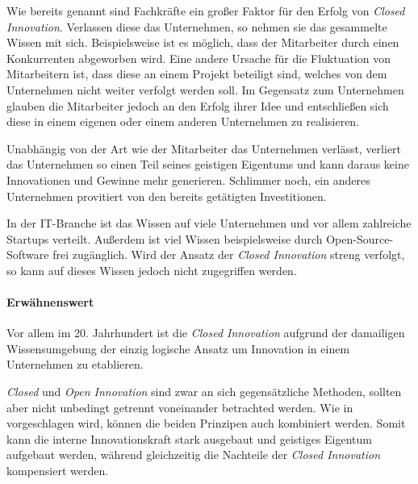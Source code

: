 Wie bereits genannt sind Fachkräfte ein großer Faktor für den Erfolg von \textit{Closed Innovation}.
Verlassen diese das Unternehmen, so nehmen sie das gesammelte Wissen mit sich.
Beispielsweise ist es möglich, dass der Mitarbeiter durch einen Konkurrenten abgeworben wird.
Eine andere Ursache für die Fluktuation von Mitarbeitern ist,
dass diese an einem Projekt beteiligt sind,
welches von dem Unternehmen nicht weiter verfolgt werden soll.
Im Gegensatz zum Unternehmen glauben die Mitarbeiter jedoch an den Erfolg ihrer Idee
und entschließen sich diese in einem eigenen oder einem anderen Unternehmen zu realisieren.

Unabhängig von der Art wie der Mitarbeiter das Unternehmen verlässt,
verliert das Unternehmen so einen Teil seines geistigen Eigentums
und kann daraus keine Innovationen und Gewinne mehr generieren.
Schlimmer noch, ein anderes Unternehmen provitiert von den bereits getätigten Investitionen.

In der IT-Branche ist das Wissen auf viele Unternehmen und vor allem zahlreiche Startups verteilt.
Außerdem ist viel Wissen beispielsweise durch Open-Source-Software frei zugänglich.
Wird der Ansatz der \textit{Closed Innovation} streng verfolgt,
so kann auf dieses Wissen jedoch nicht zugegriffen werden.

\paragraph{Erwähnenswert}\label{sec:bewertung-erw}
Vor allem im 20. Jahrhundert ist die \textit{Closed Innovation}
aufgrund der damailigen Wissensumgebung
der einzig logische Ansatz um Innovation in einem Unternehmen zu etablieren.

\textit{Closed} und \textit{Open Innovation} sind zwar an sich gegensätzliche Methoden,
sollten aber nicht unbedingt getrennt voneinander betrachted werden.
Wie in \cite{OpenInno32:online} vorgeschlagen wird,
können die beiden Prinzipen auch kombiniert werden.
Somit kann die interne Innovationskraft stark ausgebaut und geistiges Eigentum aufgebaut werden,
während gleichzeitig die Nachteile der \textit{Closed Innovation} kompensiert werden.
